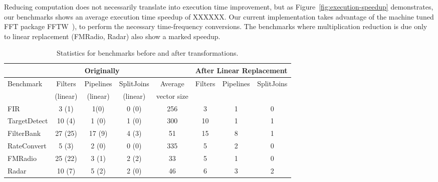 Reducing computation does not necessarily translate into execution time improvement, but as
Figure~\ref{fig:execution-speedup} demonstrates, our benchmarks shows an average execution time speedup of XXXXXX.
Our current implementation takes advantage of the machine tuned 
FFT package FFTW~\cite{frigo99fast}), to perform the necessary time-frequency conversions. 
The benchmarks where multiplication reduction is due only to linear replacement (FMRadio, Radar) 
also show a marked speedup.



\begin{table*}[t]
\centering
\small
\begin{tabular}{|l|c|c|c||c||c|c|c|} 
\hline
          & \multicolumn{3}{|c||}{Originally}  &             & \multicolumn{3}{|c|}{After Linear Replacement} \\
\hline
Benchmark & Filters & Pipelines & SplitJoins & Average     & Filters      & Pipelines         & SplitJoins \\
          & (linear)& (linear)  & (linear)   & vector size &              &                   &            \\
\hline
FIR       & 3 (1)  & 1(0)      & 0 (0)      & 256         & 3            & 1                 & 0 \\
\hline
TargetDetect & 10 (4)& 1 (0)    & 1 (0)      & 300         & 10           & 1                 & 1 \\
\hline
FilterBank & 27 (25) & 17 (9)   & 4 (3)      & 51          & 15           & 8                 & 1 \\
\hline
RateConvert& 5 (3)   & 2 (0)    & 0 (0)      & 335         & 5            & 2                 & 0 \\
\hline
FMRadio    & 25 (22) & 3 (1)    & 2 (2)      & 33          & 5            & 1                 & 0 \\
\hline
Radar      & 10 (7) & 5 (2)     & 2 (0)      & 46          & 6            & 3                 & 2 \\
\hline
\end{tabular}
\caption{Statistics for benchmarks before and after transformations.}
\label{fig:benchmark-statistics}
\end{table*}
